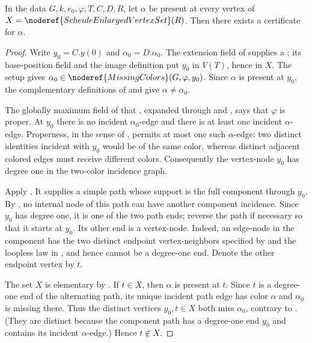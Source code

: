 \begin{helper}
In the data $G,k,e_0,\varphi,T,C,D,R$, let $\alpha$ be present at every
vertex of $X=\noderef{ScheideEnlargedVertexSet}(R)$.  Then there exists a
 certificate for $\alpha$.
\end{helper}
\begin{proof}
Write $y_0=C.y(0)$ and $\alpha_0=D.\alpha_0$.  The extension field of
 supplies a
; its base-position field and the image
definition  put $y_0$ in $V(T)$, hence in
$X$.  The setup  gives
$\alpha_0\in\noderef{MissingColors}(G,\varphi,y_0)$.  Since $\alpha$ is
present at $y_0$, the complementary definitions of
 and  give
$\alpha\ne\alpha_0$.

The globally maximum field of that
, expanded through
 and , says that $\varphi$
is proper.  At $y_0$ there is no incident $\alpha_0$-edge and there is
at least one incident $\alpha$-edge.  Properness, in the sense of
, permits at most one such $\alpha$-edge:
two distinct identities incident with $y_0$ would be
 of the same color, whereas distinct adjacent
colored edges must receive different colors.  Consequently the vertex-node
$y_0$ has degree one in the two-color incidence graph.

Apply .  It supplies a simple path
whose support is the full component through $y_0$.  By
, no internal node of this path
can have another component incidence.  Since $y_0$ has degree one, it is
one of the two path ends; reverse the path if necessary so that it starts
at $y_0$.  Its other end is a vertex-node.  Indeed, an edge-node in the
component has the two distinct endpoint vertex-neighbors specified by
 and the loopless law in
, and hence cannot be a degree-one end.
Denote the other endpoint vertex by $t$.

The set $X$ is elementary by .  If
$t\in X$, then $\alpha$ is present at $t$.  Since $t$ is a degree-one
end of the alternating path, its unique incident path edge has color
$\alpha$ and $\alpha_0$ is missing there.  Thus the distinct vertices
$y_0,t\in X$ both miss $\alpha_0$, contrary to
.  (They are distinct because the
component path has a degree-one end $y_0$ and contains its incident
$\alpha$-edge.)  Hence $t\notin X$.


\end{proof}
